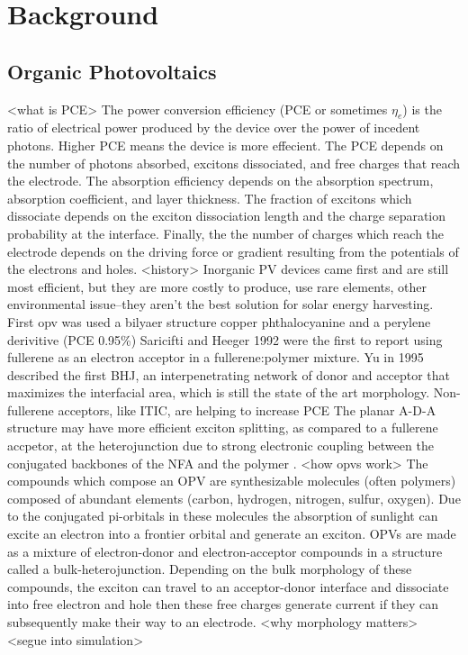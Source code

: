 \section*{Background}

\subsection*{Organic Photovoltaics}
<what is PCE>
The power conversion efficiency (PCE or sometimes $\eta_{e}$) is the ratio of electrical power produced by the device over the power of incedent photons. Higher PCE means the device is more effecient.  
The PCE depends on the number of photons absorbed, excitons dissociated, and free charges that reach the electrode. The absorption efficiency depends on the absorption spectrum, absorption coefficient, and layer thickness. The fraction of excitons which dissociate depends on the exciton dissociation length and the charge separation probability at the interface. Finally, the the number of charges which reach the electrode depends on the driving force or gradient resulting from the potentials of the electrons and holes.\cite{Hoppe2004}
<history>
Inorganic PV devices came first and are still most efficient, but they are more costly to produce, use rare elements, other environmental issue--they aren't the best solution for solar energy harvesting. 
First opv was \cite{Tang1986b} used a bilyaer structure copper phthalocyanine and a perylene derivitive (PCE 0.95\%)
Saricifti and Heeger 1992 \cite{Saricifti1992} were the first to report using fullerene as an electron acceptor in a fullerene:polymer mixture.
Yu in 1995 described the first BHJ, an interpenetrating network of donor and acceptor that maximizes the interfacial area, which is still the state of the art morphology. \cite{Yu1995}
Non-fullerene acceptors, like ITIC, are helping to increase PCE \cite{S.Gurney2019}
The planar A-D-A structure may have more efficient exciton splitting, as compared to a fullerene accpetor, at the heterojunction due to strong electronic coupling between the conjugated backbones of the NFA and the polymer \cite{Yi2018}.
<how opvs work>
The compounds which compose an OPV are synthesizable molecules (often polymers) composed of abundant elements (carbon, hydrogen, nitrogen, sulfur, oxygen).
Due to the conjugated pi-orbitals in these molecules the absorption of sunlight can excite an electron into a frontier orbital and generate an exciton.
OPVs are made as a mixture of electron-donor and electron-acceptor compounds in a structure called a bulk-heterojunction.
Depending on the bulk morphology of these compounds, the exciton can travel to an acceptor-donor interface and dissociate into free electron and hole then these free charges generate current if they can subsequently make their way to an electrode.
<why morphology matters>
<segue into simulation>


